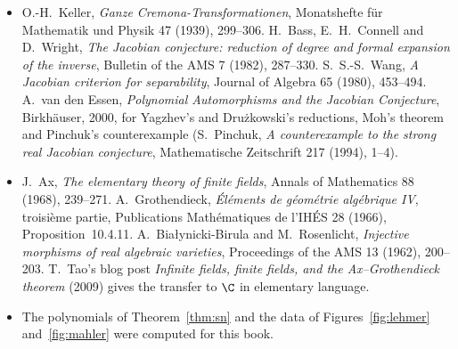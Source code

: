 \begin{itemize}
M.~J.~Mossinghoff, \emph{The Mahler measure of polynomials with odd coefficients}, Bulletin of the London Mathematical Society 36 (2004), 332--338.
\item O.-H.~Keller, \emph{Ganze Cremona-Trans\-for\-ma\-tio\-nen}, Monatshefte f\"ur Mathematik und Physik 47 (1939), 299--306. H.~Bass, E.~H.~Connell and
D.~Wright, \emph{The Jacobian conjecture: reduction of degree and formal expansion of the inverse}, Bulletin of the AMS 7 (1982), 287--330. S.~S.-S.~Wang,
\emph{A Jacobian criterion for separability}, Journal of Algebra 65 (1980), 453--494. A.~van den Essen, \emph{Polynomial Automorphisms and the Jacobian
Conjecture}, Birkh\"auser, 2000, for Yagzhev's and Dru\.zkowski's reductions, Moh's theorem and Pinchuk's counterexample (S.~Pinchuk,
\emph{A counterexample to the strong real Jacobian conjecture}, Mathematische Zeitschrift 217 (1994), 1--4).
\item J.~Ax, \emph{The elementary theory of finite fields}, Annals of Mathematics 88 (1968), 239--271. A.~Grothendieck, \emph{\'El\'ements de g\'eom\'etrie
alg\'ebrique IV}, troisi\`eme partie, Publications Math\'ematiques de l'IH\'ES 28 (1966), Proposition~10.4.11. A.~Bia\l ynicki-Birula and M.~Rosenlicht,
\emph{Injective morphisms of real algebraic varieties}, Proceedings of the AMS 13 (1962), 200--203. T.~Tao's blog post \emph{Infinite fields, finite fields, and the
Ax--Grothendieck theorem} (2009) gives the transfer to $\C$ in elementary language.
\item The polynomials of Theorem~\ref{thm:sn} and the data of Figures~\ref{fig:lehmer} and~\ref{fig:mahler} were computed for this book.
\end{itemize}
